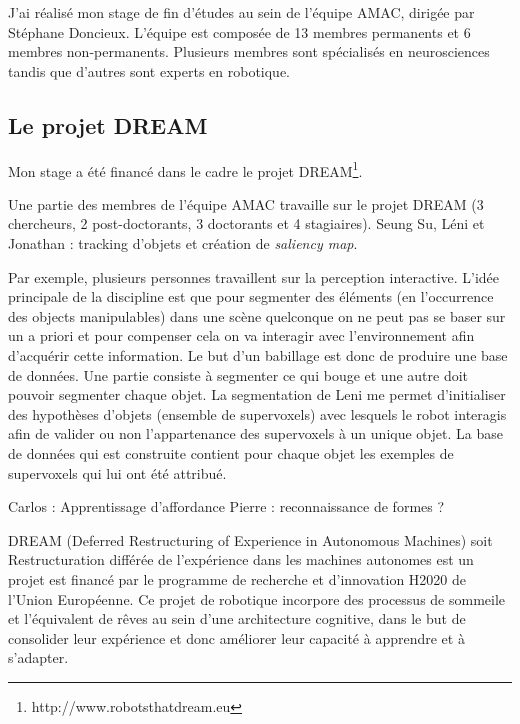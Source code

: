 \documentclass{llncs}
\begin{document}
J'ai réalisé mon stage de fin d'études au sein de l'équipe AMAC, dirigée par Stéphane Doncieux. L'équipe est composée de 13 membres permanents et 6 membres non-permanents. Plusieurs membres sont spécialisés en neurosciences tandis que d'autres sont experts en robotique.

\subsection{Le projet DREAM}
Mon stage a été financé dans le cadre le projet DREAM\footnote{http://www.robotsthatdream.eu}.

Une partie des membres de l'équipe AMAC travaille sur le projet DREAM (3 chercheurs, 2 post-doctorants, 3 doctorants et 4 stagiaires).
Seung Su, Léni et Jonathan : tracking d'objets et création de \textit{saliency map}.

Par exemple, plusieurs personnes travaillent sur la perception interactive. L'idée principale de la discipline est que pour segmenter des éléments (en l'occurrence des objects manipulables) dans une scène quelconque on ne peut pas se baser sur un a priori et pour compenser cela on va interagir avec l'environnement afin d'acquérir cette information. Le but d'un babillage est donc de produire une base de données. Une partie consiste à segmenter ce qui bouge et une autre doit pouvoir segmenter chaque objet. La segmentation de Leni me permet d'initialiser des hypothèses d'objets (ensemble de supervoxels) avec lesquels le robot interagis afin de valider ou non l'appartenance des supervoxels à un unique objet. La base de données qui est construite contient pour chaque objet les exemples de supervoxels qui lui ont été attribué.

Carlos : Apprentissage d'affordance
Pierre : reconnaissance de formes ?

DREAM (Deferred Restructuring of Experience in Autonomous Machines) soit Restructuration différée de l'expérience dans les machines autonomes est un projet est financé par le programme de recherche et d'innovation H2020 de l'Union Européenne. Ce projet de robotique incorpore des processus de sommeile et l'équivalent de rêves au sein d'une architecture cognitive, dans le but de consolider leur expérience et donc améliorer leur capacité à apprendre et à s'adapter.

\end{document}
